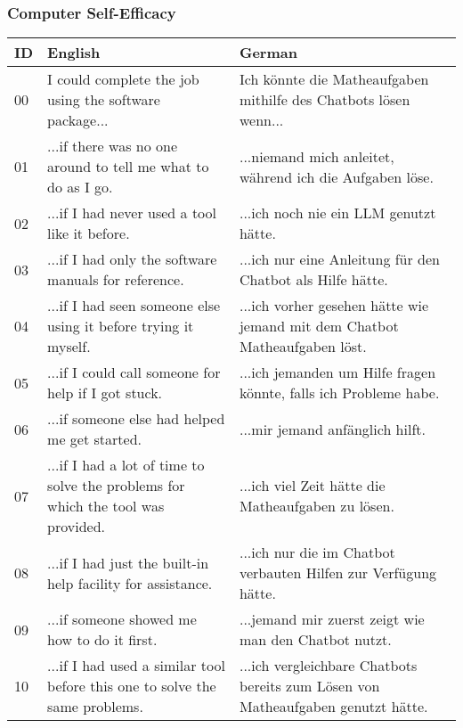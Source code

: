 \endgroup

\clearpage
\subsubsection*{Computer Self-Efficacy}

\begingroup
\setlength{\tabcolsep}{12pt}
\renewcommand{\arraystretch}{1.5}

\begin{table}[ht]
\begin{tabularx}{\textwidth}{l|X|X}
    \textbf{ID} & \textbf{English} & \textbf{German} \\
    \hline
    00 & I could complete the job using the software package... & Ich könnte die Matheaufgaben mithilfe des Chatbots lösen wenn... \\
    \hline
    01 & ...if there was no one around to tell me what to do as I go. & ...niemand mich anleitet, während ich die Aufgaben löse. \\
    02 & ...if I had never used a tool like it before. & ...ich noch nie ein LLM genutzt hätte. \\
    03 & ...if I had only the software manuals for reference. & ...ich nur eine Anleitung für den Chatbot als Hilfe hätte. \\
    04 & ...if I had seen someone else using it before trying it myself. & ...ich vorher gesehen hätte wie jemand mit dem Chatbot Matheaufgaben löst. \\
    05 & ...if I could call someone for help if I got stuck. & ...ich jemanden um Hilfe fragen könnte, falls ich Probleme habe. \\
    06 & ...if someone else had helped me get started. & ...mir jemand anfänglich hilft. \\
    07 & ...if I had a lot of time to solve the problems for which the tool was provided. & ...ich viel Zeit hätte die Matheaufgaben zu lösen. \\
    08 & ...if I had just the built-in help facility for assistance. & ...ich nur die im Chatbot verbauten Hilfen zur Verfügung hätte. \\
    09 & ...if someone showed me how to do it first. & ...jemand mir zuerst zeigt wie man den Chatbot nutzt. \\
    10 & ...if I had used a similar tool before this one to solve the same problems. & ...ich vergleichbare Chatbots bereits zum Lösen von Matheaufgaben genutzt hätte. \\
\end{tabularx}
\end{table}

